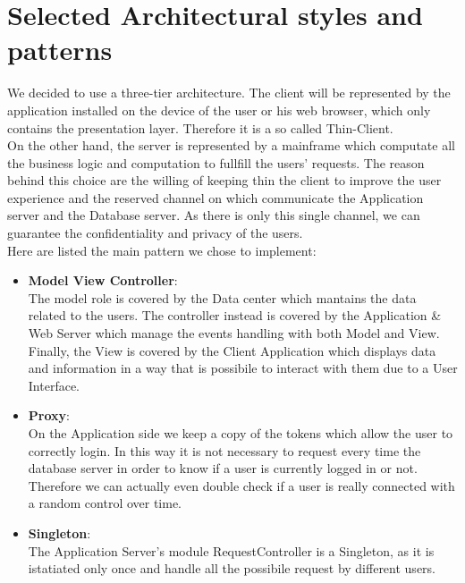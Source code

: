 \documentclass[numbers=noenddot, 12pt, a4paper, oneside]{scrbook}
\begin{document}
\section{Selected Architectural styles and patterns}

We decided to use a three-tier architecture. The client will be represented by the application installed on the device of the user or his web browser, which only contains the presentation layer. Therefore it is a so called Thin-Client.\\

On the other hand, the server is represented by a mainframe which computate all the business logic and computation to fullfill the users' requests. The reason behind this choice are the willing of keeping thin the client to improve the user experience and the reserved channel on which communicate the Application server and the Database server. As there is only this single channel, we can guarantee the confidentiality and privacy of the users. \\

Here are listed the main pattern we chose to implement:
\begin{itemize}
	\item \textbf{Model View Controller}:\\\newline
	The model role is covered by the Data center which mantains the data related to the users. The controller instead is covered by the Application \& Web Server which manage the events handling with both Model and View. Finally, the View is covered by the Client Application which displays data and information in a way that is possibile to interact with them due to a User Interface.\\

	\item \textbf{Proxy}:\\\newline
	On the Application side we keep a copy of the tokens which allow the user to correctly login. In this way it is not necessary to request every time the database server in order to know if a user is currently logged in or not. Therefore we can actually even double check if a user is really connected with a random control over time.\\

	\item \textbf{Singleton}:\\\newline
	The Application Server's module RequestController is a Singleton, as it is istatiated only once and handle all the possibile request by different users.\\

\end{itemize}
\end{document}
